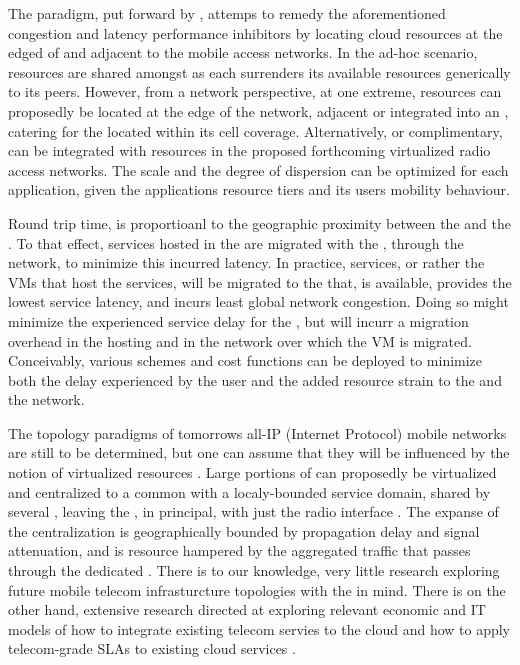 The \xcloud{} paradigm, put forward by \cite{chandra2013decentralized,ericsson_akami,satyanarayanan2009case,kiukkonen2010towards,ucloud}, attemps to remedy the aforementioned congestion and latency performance inhibitors by locating cloud resources at the edged of and adjacent to the mobile access networks. In the ad-hoc scenario, resources are shared amongst \ues{} as each \ue{} surrenders its available resources generically to its peers. However, from a network perspective, at one extreme, \dc{} resources can proposedly be located at the edge of the network, adjacent or integrated into an \rbs{}, catering for the \ues{} located within its cell coverage. Alternatively, or complimentary, \dcs{} can be integrated with resources in the proposed forthcoming virtualized radio access networks. The scale and the degree of dispersion can be optimized for each application, given the applications resource tiers and its users mobility behaviour.

Round trip time, is proportioanl to the geographic proximity between the \ue{} and the \dc{}. To that effect, services hosted in the \xcloud{} are migrated with the \ue{}, through the network, to minimize this incurred latency. In practice, services, or rather the VMs that host the services, will be migrated to the \dc{} that, is available, provides the lowest service latency, and incurs least global network congestion. Doing so might minimize the experienced service delay for the \ue{}, but will incurr a migration overhead in the hosting \dc{} and in the network over which the VM is migrated. Conceivably, various schemes and cost functions can be deployed to minimize both the delay experienced by the user and the added resource strain to the \dc{} and the network.

The topology paradigms of tomorrows all-IP (Internet Protocol) mobile networks \cite{6144211,5357099} are still to be determined, but one can assume that they will be influenced by the notion of virtualized resources \cite{baroncelli2010network, chowdhury2009network}. Large portions of \rbss{} can proposedly be virtualized and centralized to a common \dc with a localy-bounded service domain, shared by several \rbss{}, leaving the \rbss, in principal, with just the radio interface \cite{melzercloud}. The expanse of the centralization is geographically bounded by propagation delay and signal attenuation, and is resource hampered by the aggregated traffic that passes through the dedicated \dc. There is to our knowledge, very little research exploring future mobile telecom infrasturcture topologies with the \xcloud{} in mind. There is on the other hand, extensive research directed at exploring relevant economic and IT models of how to integrate existing telecom servies to the cloud and how to apply telecom-grade SLAs to existing cloud services \cite{EricssonWhitePaper,6156350, 5357099}.

